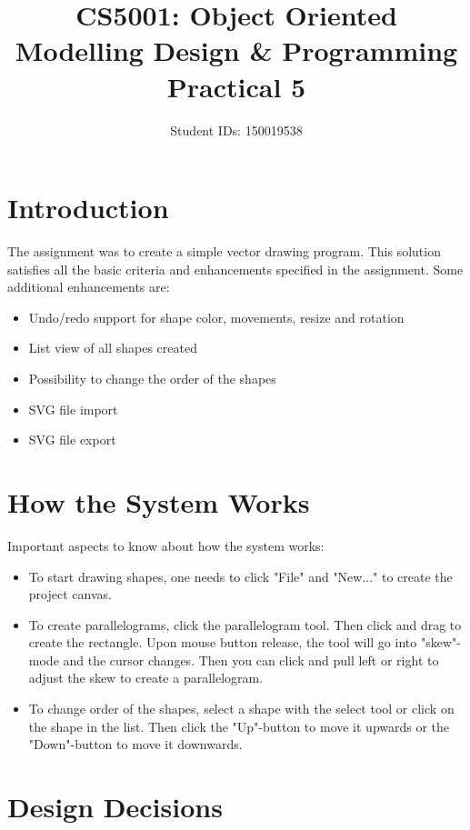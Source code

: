 \documentclass[11pt, a4paper]{article}
\title{CS5001: Object Oriented Modelling Design \& Programming\\Practical 5}
\author{Student IDs: 150019538}
\begin{document}
\maketitle

\section{Introduction}

The assignment was to create a simple vector drawing program. This solution satisfies all the basic criteria and enhancements  specified in the assignment. Some additional enhancements are: 

\begin{itemize}
	\item Undo/redo support for shape color, movements, resize and rotation
	\item List view of all shapes created
	\item Possibility to change the order of the shapes
	\item SVG file import
	\item SVG file export
\end{itemize}

\section{How the System Works}

Important aspects to know about how the system works:

\begin{itemize}
	\item To start drawing shapes, one needs to click "File" and "New..." to create the project canvas.
	\item To create parallelograms, click the parallelogram tool. Then click and drag to create the rectangle. Upon mouse button release, the tool will go into "skew"-mode and the cursor changes. Then you can click and pull left or right to adjust the skew to create a parallelogram.
	\item To change order of the shapes, select a shape with the select tool or click on the shape in the list. Then click the "Up"-button to move it upwards or the "Down"-button to move it downwards.  
\end{itemize}

\section{Design Decisions}
\end{document}
